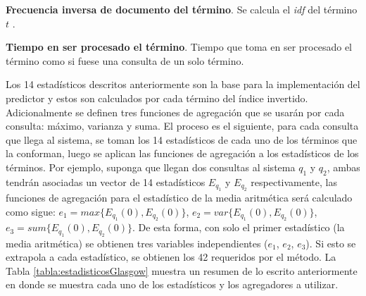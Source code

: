 \begin{list}{}{}
	\item \textbf{Frecuencia inversa de documento del término}. Se calcula el \textit{idf} del término $t$ \citep{Baeza-Yates:2011}.
	
	\item \textbf{Tiempo en ser procesado el término}. Tiempo que toma en ser procesado el término como si fuese una consulta de un solo término.

\end{list}

Los 14 estadísticos descritos anteriormente son la base para la implementación del predictor y estos son calculados por cada término del índice invertido. Adicionalmente se definen tres funciones de agregación que se usarán por cada consulta: máximo, varianza y suma. El proceso es el siguiente, para cada consulta que llega al sistema, se toman los 14 estadísticos de cada uno de los términos que la conforman, luego se aplican las funciones de agregación a los estadísticos de los términos. Por ejemplo, suponga que llegan dos consultas al sistema $q_1$ y $q_2$, ambas tendrán asociadas un vector de 14 estadísticos $E_{q_1}$ y $E_{q_2}$ respectivamente, las funciones de agregación para el estadístico de la media aritmética será calculado como sigue: $e_1 = max\{E_{q_1}(0), E_{q_2}(0)\}$, $e_2 = var\{E_{q_1}(0), E_{q_2}(0)\}$, $e_3 = sum\{E_{q_1}(0), E_{q_2}(0)\}$. De esta forma, con solo el primer estadístico (la media aritmética) se obtienen tres variables independientes ($e_1$, $e_2$, $e_3$). Si esto se extrapola a cada estadístico, se obtienen los 42 requeridos por el método. 
La Tabla \ref{tabla:estadisticosGlasgow} muestra un resumen de lo escrito anteriormente en donde se muestra cada uno de los estadísticos y los agregadores a utilizar. 

